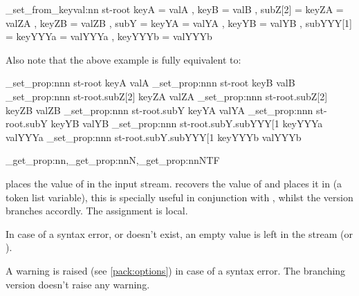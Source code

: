\documentclass[10pt]{article}
\begin{document}
\begin{codestore}[store-env=keyval.demo8]
\starray_set_from_keyval:nn {st-root} 
  {
    keyA = valA ,
    keyB = valB ,
    subZ[2] = 
      {
        keyZA = valZA ,
        keyZB = valZB ,
      }
    subY  =
      {
        keyYA = valYA ,
        keyYB = valYB ,
        subYYY[1] =
          {
            keyYYYa = valYYYa ,
            keyYYYb = valYYYb 
          }
      }
  }  
\end{codestore}


Also note that the above example is fully equivalent to:

\begin{codestore}[store-env=keyval.demo9]
\starray_set_prop:nnn {st-root} {keyA} {valA}
\starray_set_prop:nnn {st-root} {keyB} {valB}
\starray_set_prop:nnn {st-root.subZ[2]} {keyZA} {valZA}
\starray_set_prop:nnn {st-root.subZ[2]} {keyZB} {valZB}
\starray_set_prop:nnn {st-root.subY} {keyYA} {valYA}
\starray_set_prop:nnn {st-root.subY} {keyYB} {valYB}
\starray_set_prop:nnn {st-root.subY.subYYY[1} {keyYYYa} {valYYYa}
\starray_set_prop:nnn {st-root.subY.subYYY[1} {keyYYYb} {valYYYb}
\end{codestore}


\begin{codedescribe}{\starray_get_prop:nn,\starray_get_prop:nnN,\starray_get_prop:nnNTF}
\begin{codesyntax}%
\end{codesyntax}
 places the value of  in the input stream. \break
{} recovers the value of  and places it in  (a token list variable), this is specially useful in conjunction with , whilst the  version branches accordly. The assignment is local.
\end{codedescribe}
\begin{tsremark}
In case of a syntax error, or  doesn't exist, an empty value is left in the stream (or ).
\end{tsremark}
\begin{tsremark}
A warning is raised (see \ref{pack:options}) in case of a  syntax error. The branching version doesn't raise any warning.
\end{tsremark}
\end{document}
